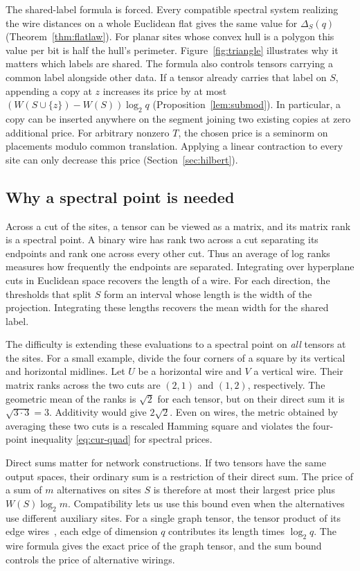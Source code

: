 The shared-label formula is forced. Every compatible spectral system
realizing the wire distances on a whole Euclidean flat gives the same
value for \(\Delta_S(q)\) (Theorem~\ref{thm:flatlaw}). For planar sites
whose convex hull is a polygon this value per bit is half the hull's
perimeter. Figure~\ref{fig:triangle} illustrates why it matters which
labels are shared. The formula also controls tensors carrying a common
label alongside other data. If a tensor already carries that label on
\(S\), appending a copy at \(z\) increases its price by at most
\((W(S\cup\{z\})-W(S))\log_2 q\) (Proposition~\ref{lem:submod}).
In particular, a copy can be inserted anywhere on the segment joining
two existing copies at zero additional price. For arbitrary nonzero
\(T\), the chosen price is a seminorm on placements modulo common
translation. Applying a linear contraction to every site can only
decrease this price (Section~\ref{sec:hilbert}).

\subsection{Why a spectral point is needed}

Across a cut of the sites, a tensor can be viewed as a matrix, and its
matrix rank is a spectral point. A binary wire has rank two across a
cut separating its endpoints and rank one across every other cut.
Thus an average of log ranks measures how frequently the endpoints are
separated. Integrating over hyperplane cuts in Euclidean space recovers
the length of a wire. For each direction, the thresholds that split \(S\) form an interval
whose length is the width of the projection. Integrating these
lengths recovers the mean width for the shared label.

The difficulty is extending these evaluations to a spectral point on
\emph{all} tensors at the sites. For a small example, divide the four
corners of a square by its vertical and horizontal midlines. Let \(U\)
be a horizontal wire and \(V\) a vertical wire. Their matrix ranks
across the two cuts are \((2,1)\) and \((1,2)\), respectively. The
geometric mean of the ranks is \(\sqrt2\) for each tensor, but on their
direct sum it is \(\sqrt{3\cdot3}=3\). Additivity would give
\(2\sqrt2\). Even on wires, the metric obtained by averaging these two
cuts is a rescaled Hamming square and violates the four-point inequality
\eqref{eq:cur-quad} for spectral prices.

Direct sums matter for network constructions. If two tensors have the
same output spaces, their ordinary sum is a restriction of their direct
sum. The price of a sum of \(m\) alternatives on sites \(S\) is
therefore at most their largest price plus \(W(S)\log_2 m\).
Compatibility lets us use this bound even when the alternatives use
different auxiliary sites. For a single graph tensor, the tensor
product of its edge wires~\cite{cvzgraph}, each edge of dimension \(q\)
contributes its length times \(\log_2 q\). The wire formula gives the exact price of the graph tensor, and the
sum bound controls the price of alternative wirings.

